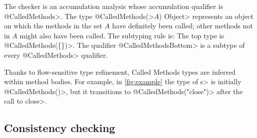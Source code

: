 The checker is an accumulation analysis whose accumulation qualifier is \<@CalledMethods>.
The type \<@CalledMethods(>$A$\<) Object>
represents an object on which the methods in the set $A$ have definitely
been called; other methods not in $A$ might also have been called.
The subtyping
rule is:
The top type is \<@CalledMethods(\{\})>.
The qualifier \<@CalledMethodsBottom> is a subtype of every \<@CalledMethods> qualifier.

Thanks to flow-sensitive type refinement,
Called Methods types are inferred within method bodies.  For example,
in \cref{fig:example} the type of \<s> is initially \<@CalledMethods({})>,
but it transitions to \<@CalledMethods("close")> after the call to \<close>.


\subsection{Consistency checking}
\label{sec:must-call-invoked}


